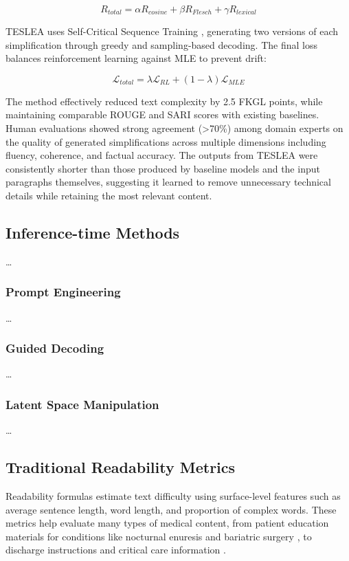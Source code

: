 \begin{equation}
    R_{total} = \alpha R_{cosine} + \beta R_{Flesch} + \gamma R_{lexical}
\end{equation}

TESLEA uses Self-Critical Sequence Training \cite{8099614}, generating two versions of each simplification through greedy and sampling-based decoding. The final loss balances reinforcement learning against MLE to prevent drift:

\begin{equation}
    \mathcal{L}_{total} = \lambda \mathcal{L}_{RL} + (1-\lambda)\mathcal{L}_{MLE}
\end{equation}

The method effectively reduced text complexity by 2.5 FKGL points, while maintaining comparable ROUGE and SARI scores with existing baselines. 
Human evaluations showed strong agreement (>70\%) among domain experts on the quality of generated simplifications across multiple dimensions including fluency, coherence, and factual accuracy.
The outputs from TESLEA were consistently shorter than those produced by baseline models and the input paragraphs themselves, suggesting it learned to remove unnecessary technical details while retaining the most relevant content.

\subsection{Inference-time Methods}
\dots

\subsubsection{Prompt Engineering}
\dots

\subsubsection{Guided Decoding}
\dots

\subsubsection{Latent Space Manipulation}
\dots

\subsection{Traditional Readability Metrics}
\label{subsec:traditional-metrics}

Readability formulas estimate text difficulty using surface-level features such as average sentence length, word length, and proportion of complex words. These metrics help evaluate many types of medical content, from patient education materials for conditions like nocturnal enuresis \cite{Fung2024-uh} and bariatric surgery \cite{Lucy2023-zi}, to discharge instructions \cite{Tuan2023-wc} and critical care information \cite{Hanci2024-wv}.

